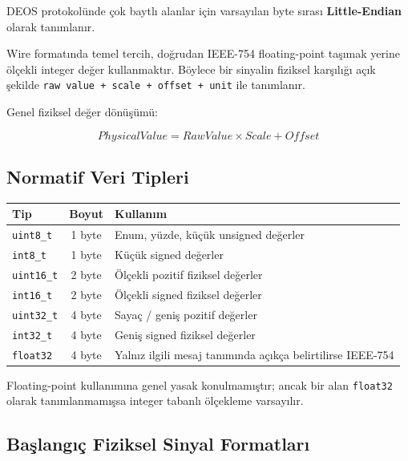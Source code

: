 \documentclass[a4paper,10pt]{article}
\newcommand{\code}[1]{\texttt{#1}}
\begin{document}
DEOS protokolünde çok baytlı alanlar için varsayılan byte sırası \textbf{Little-Endian}
olarak tanımlanır.

Wire formatında temel tercih, doğrudan IEEE-754 floating-point taşımak yerine ölçekli
integer değer kullanmaktır. Böylece bir sinyalin fiziksel karşılığı açık şekilde
\code{raw value + scale + offset + unit} ile tanımlanır.

Genel fiziksel değer dönüşümü:

\[
PhysicalValue = RawValue \times Scale + Offset
\]

\subsection{Normatif Veri Tipleri}

\begin{center}
\begin{tabularx}{\textwidth}{l c X}
\toprule
Tip & Boyut & Kullanım \\
\midrule
\code{uint8\_t}  & 1 byte & Enum, yüzde, küçük unsigned değerler \\
\code{int8\_t}   & 1 byte & Küçük signed değerler \\
\code{uint16\_t} & 2 byte & Ölçekli pozitif fiziksel değerler \\
\code{int16\_t}  & 2 byte & Ölçekli signed fiziksel değerler \\
\code{uint32\_t} & 4 byte & Sayaç / geniş pozitif değerler \\
\code{int32\_t}  & 4 byte & Geniş signed fiziksel değerler \\
\code{float32}   & 4 byte & Yalnız ilgili mesaj tanımında açıkça belirtilirse IEEE-754 \\
\bottomrule
\end{tabularx}
\end{center}

Floating-point kullanımına genel yasak konulmamıştır; ancak bir alan \code{float32}
olarak tanımlanmamışsa integer tabanlı ölçekleme varsayılır.

\subsection{Başlangıç Fiziksel Sinyal Formatları}
\end{document}

